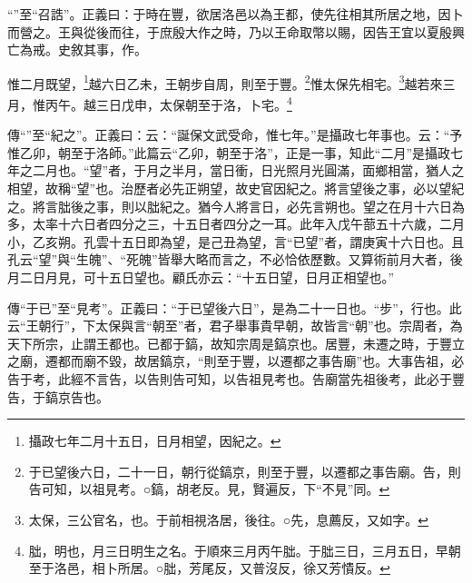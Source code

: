{\noindent\shu{}\fzkt “”至“召誥”。正義曰：于時在豐，欲居洛邑以為王都，使先往相其所居之地，因卜而營之。王與從後而往，于庶殷大作之時，乃以王命取幣以賜，因告王宜以夏殷興亡為戒。史敘其事，作。 \par}

惟二月既望，\footnote{攝政七年二月十五日，日月相望，因紀之。}越六日乙未，王朝步自周，則至于豐。\footnote{于已望後六日，二十一日，朝行從鎬京，則至于豐，以遷都之事告廟。告，則告可知，以祖見考。○鎬，胡老反。見，賢遍反，下“不見”同。}惟太保先相宅。\footnote{太保，三公官名，也。于前相視洛居，後往。○先，息薦反，又如字。}越若來三月，惟丙午。越三日戊申，太保朝至于洛，卜宅。\footnote{朏，明也，月三日明生之名。于順來三月丙午朏。于朏三日，三月五日，早朝至于洛邑，相卜所居。○朏，芳尾反，又普沒反，徐又芳憒反。}


{\noindent\zhuan{}\fzbyks 傳“”至“紀之”。正義曰：云：“誕保文武受命，惟七年。”是攝政七年事也。云：“予惟乙卯，朝至于洛師。”此篇云“乙卯，朝至于洛”，正是一事，知此“二月”是攝政七年之二月也。“望”者，于月之半月，當日衝，日光照月光圓滿，面鄉相當，猶人之相望，故稱“望”也。治歷者必先正朔望，故史官因紀之。將言望後之事，必以望紀之。將言朏後之事，則以朏紀之。猶今人將言日，必先言朔也。望之在月十六日為多，太率十六日者四分之三，十五日者四分之一耳。此年入戊午蔀五十六歲，二月小，乙亥朔。孔雲十五日即為望，是己丑為望，言“已望”者，謂庚寅十六日也。且孔云“望”與“生魄”、“死魄”皆舉大略而言之，不必恰依歷數。又算術前月大者，後月二日月見，可十五日望也。顧氏亦云：“十五日望，日月正相望也。” \par}

{\noindent\zhuan{}\fzbyks 傳“于已”至“見考”。正義曰：“于已望後六日”，是為二十一日也。“步”，行也。此云“王朝行”，下太保與言“朝至”者，君子舉事貴早朝，故皆言“朝”也。宗周者，為天下所宗，止謂王都也。已都于鎬，故知宗周是鎬京也。居豐，未遷之時，于豐立之廟，遷都而廟不毀，故居鎬京，“則至于豐，以遷都之事告廟”也。大事告祖，必告于考，此經不言告，以告則告可知，以告祖見考也。告廟當先祖後考，此必于豐告，于鎬京告也。 \par}


